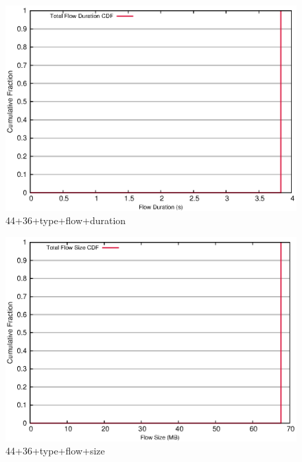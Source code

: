 \documentclass[landscape]{article}
\begin{document}
\begin{figure}[!hbt]
\centering
\includegraphics[width=1\textwidth]{44_36_type_flow_duration.eps}
\caption{44+36+type+flow+duration}

\end{figure}


\newpage

\begin{figure}[!hbt]
\centering
\includegraphics[width=1\textwidth]{44_36_type_flow_size.eps}
\caption{44+36+type+flow+size}

\end{figure}


\newpage
\end{document}
